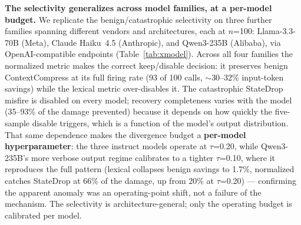 \textbf{The selectivity generalizes across model families, at a per-model budget.} We
replicate the benign/catastrophic selectivity on three further families spanning different
vendors and architectures, each at $n$=100: Llama-3.3-70B (Meta), Claude Haiku~4.5
(Anthropic), and Qwen3-235B (Alibaba), via OpenAI-compatible endpoints
(Table~\ref{tab:xmodel}). Across all four families the normalized metric makes the correct
keep/disable decision: it preserves benign ContextCompress at its full firing rate (93 of 100
calls, $\sim$30--32\% input-token savings) while the lexical metric over-disables it. The
catastrophic StateDrop misfire is disabled on every model; recovery completeness varies with
the model (35--93\% of the damage prevented) because it depends on how quickly the
five-sample disable triggers, which is a function of the model's output distribution. That
same dependence makes the divergence budget a \textbf{per-model hyperparameter}: the three
instruct models operate at $\tau$=0.20, while Qwen3-235B's more verbose output regime
calibrates to a tighter $\tau$=0.10, where it reproduces the full pattern (lexical collapses
benign savings to 1.7\%, normalized catches StateDrop at 66\% of the damage, up from 20\% at
$\tau$=0.20) --- confirming the apparent anomaly was an operating-point shift, not a failure
of the mechanism. The selectivity is architecture-general; only the operating budget is
calibrated per model.

